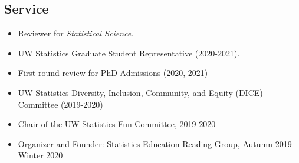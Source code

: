 \documentclass[margin, 10pt]{res} %
\begin{document}
\begin{resume}
{\section{Service}
\begin{itemize}
\item Reviewer for \textit{Statistical Science}.
      \item UW Statistics Graduate Student Representative (2020-2021). 
    \item First round review for PhD Admissions (2020, 2021) 
    \item UW Statistics Diversity, Inclusion, Community, and Equity (DICE) Committee (2019-2020)
    \item Chair of the UW Statistics Fun Committee, 2019-2020
    \item Organizer and Founder: Statistics Education Reading Group, Autumn 2019-Winter 2020
   \end{itemize}




}
\end{resume}
\end{document}
